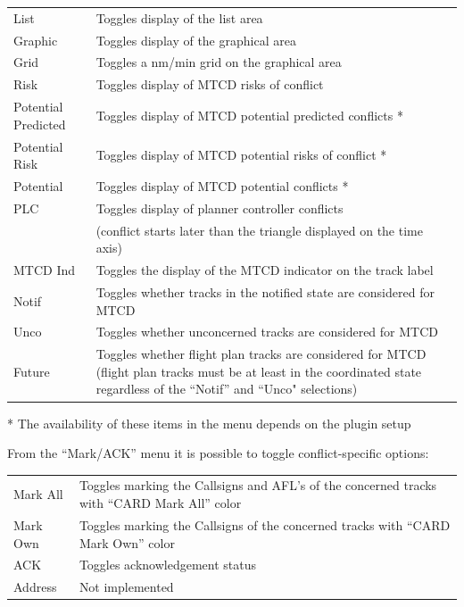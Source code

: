 \documentclass[11pt,a4paper,oldfontcommands]{memoir}
\begin{document}
\begin{tabular}{l l}
    List                & Toggles display of the list area\\
    Graphic             & Toggles display of the graphical area\\
    Grid                & Toggles a nm/min grid on the graphical area\\
    Risk                & Toggles display of MTCD risks of conflict\\
    Potential Predicted & Toggles display of MTCD potential predicted conflicts *\\
    Potential Risk      & Toggles display of MTCD potential risks of conflict *\\
    Potential           & Toggles display of MTCD potential conflicts *\\
    PLC                 & Toggles display of planner controller conflicts\\
                        & (conflict starts later than the triangle displayed on the time axis)\\
    MTCD Ind            & Toggles the display of the MTCD indicator on the track label\\
    Notif               & Toggles whether tracks in the notified state are considered for MTCD\\
    Unco                & Toggles whether unconcerned tracks are considered for MTCD\\
    Future              & Toggles whether flight plan tracks are considered for MTCD (flight plan tracks must be at least in the coordinated state regardless of the “Notif” and “Unco" selections)\\
\end{tabular}

* The availability of these items in the menu depends on the plugin setup

From the “Mark/ACK” menu it is possible to toggle conflict-specific options:

\begin{tabular}{l l}
    Mark All    & Toggles marking the Callsigns and AFL’s of the concerned tracks with “CARD Mark All” color\\
    Mark Own    & Toggles marking the Callsigns of the concerned tracks with “CARD Mark Own” color\\
    ACK         & Toggles acknowledgement status\\
    Address     & Not implemented\\
\end{tabular}
\end{document}
